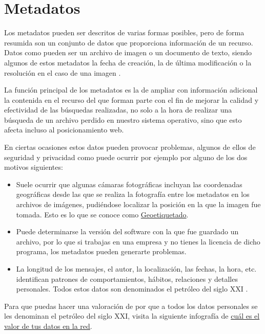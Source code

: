 \documentclass[
  a4paper,
  openany]{book}
\begin{document}
\hypertarget{metadatos}{%
\section{Metadatos}\label{metadatos}}

Los metadatos pueden ser descritos de varias formas posibles, pero de forma resumida son un conjunto de datos que proporciona información de un recurso. Datos como pueden ser un archivo de imagen o un documento de texto, siendo algunos de estos metadatos la fecha de creación, la de última modificación o la resolución en el caso de una imagen \citep{WIKI-meta}.

La función principal de los metadatos es la de ampliar con información adicional la contenida en el recurso del que forman parte con el fin de mejorar la calidad y efectividad de las búsquedas realizadas, no solo a la hora de realizar una búsqueda de un archivo perdido en nuestro sistema operativo, sino que esto afecta incluso al posicionamiento web.

En ciertas ocasiones estos datos pueden provocar problemas, algunos de ellos de seguridad y privacidad como puede ocurrir por ejemplo por alguno de los dos motivos siguientes:

\begin{itemize}
\item
  Suele ocurrir que algunas cámaras fotográficas incluyan las coordenadas geográficas desde las que se realiza la fotografía entre los metadatos en los archivos de imágenes, pudiéndose localizar la posición en la que la imagen fue tomada. Esto es lo que se conoce como \href{https://es.wikipedia.org/wiki/Geoetiquetado}{Geoetiquetado}.
\item
  Puede determinarse la versión del software con la que fue guardado un archivo, por lo que si trabajas en una empresa y no tienes la licencia de dicho programa, los metadatos pueden generarte problemas.
\item
  La longitud de los mensajes, el autor, la localización, las fechas, la hora, etc. identifican patrones de comportamientos, hábitos, relaciones y detalles personales. Todos estos datos son denominados el petróleo del siglo XXI \citep{OSI-petroleo-S-XXI}.
\end{itemize}

Para que puedas hacer una valoración de por que a todos los datos personales se les denominan el petróleo del siglo XXI, visita la siguiente infografía de \href{https://www.osi.es/sites/default/files/images/concienciacion/c15-pdf-infografia-ciberdelincuentes_reyes.pdf}{cuál es el valor de tus datos en la red}.
\end{document}
